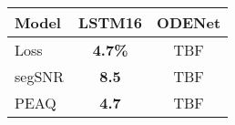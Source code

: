 \newcommand{\modelNameCellWidth}{1.8cm}
    \begin{tabular}{@{} l | c c @{}}
        \toprule
        Model & LSTM16 & ODENet \\ \midrule
        Loss    & \textbf{4.7\%} & TBF \\
        segSNR  & \textbf{8.5} & TBF  \\
        PEAQ     & \textbf{4.7} & TBF \\ \bottomrule
    \end{tabular}%
    